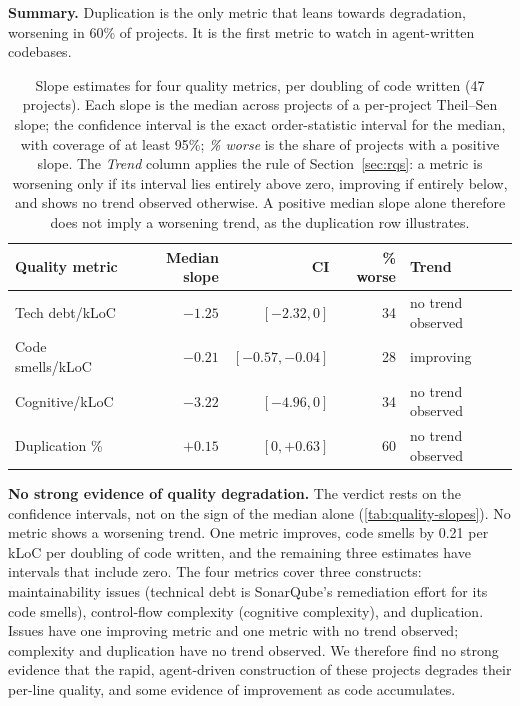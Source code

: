 \documentclass[smallextended]{svjour3}
\begin{document}
\textbf{Summary.}
Duplication is the only metric that leans towards degradation, worsening in 60\% of projects.
It is the first metric to watch in agent-written codebases.

\begin{table}[tbp]
\centering
\small
\setlength{\tabcolsep}{4pt}
\begin{tabular}{@{}l r r r l@{}}
\hline
Quality metric & Median slope & CI & \% worse & Trend \\
\hline
Tech debt/kLoC & $-1.25$ & $[-2.32, 0]$ & 34 & no trend observed \\
Code smells/kLoC & $-0.21$ & $[-0.57, -0.04]$ & 28 & improving \\
Cognitive/kLoC & $-3.22$ & $[-4.96, 0]$ & 34 & no trend observed \\
Duplication \% & $+0.15$ & $[0, +0.63]$ & 60 & no trend observed \\
\hline
\end{tabular}
\caption{Slope estimates for four quality metrics, per doubling of code written (47 projects). Each slope is the median across projects of a
per-project Theil--Sen slope; the confidence interval is the exact
order-statistic interval for the median, with coverage of at least
95\%; \emph{\% worse} is the share of projects with a positive slope.
The \emph{Trend} column applies the rule of Section~\ref{sec:rqs}: a metric
is worsening only if its interval lies entirely above zero, improving if
entirely below, and shows no trend observed otherwise. A positive median slope
alone therefore does not imply a worsening trend, as the duplication row
illustrates.}
\label{tab:quality-slopes}
\end{table}
% 
\textbf{No strong evidence of quality degradation.} The verdict rests on the
confidence intervals, not on the sign of the median alone
(\autoref{tab:quality-slopes}). No metric shows a worsening trend.
One metric improves, code smells by 0.21 per kLoC per doubling of code written, and the
remaining three estimates have intervals that include zero.
The four metrics cover three constructs: maintainability issues (technical debt is SonarQube's remediation effort for its code smells), control-flow complexity (cognitive complexity), and duplication.
Issues have one improving metric and one metric with no trend observed; complexity and duplication have no trend observed.
We therefore find no
strong evidence that the rapid, agent-driven construction of these projects
degrades their per-line quality, and some evidence of improvement as code
accumulates.
\end{document}
